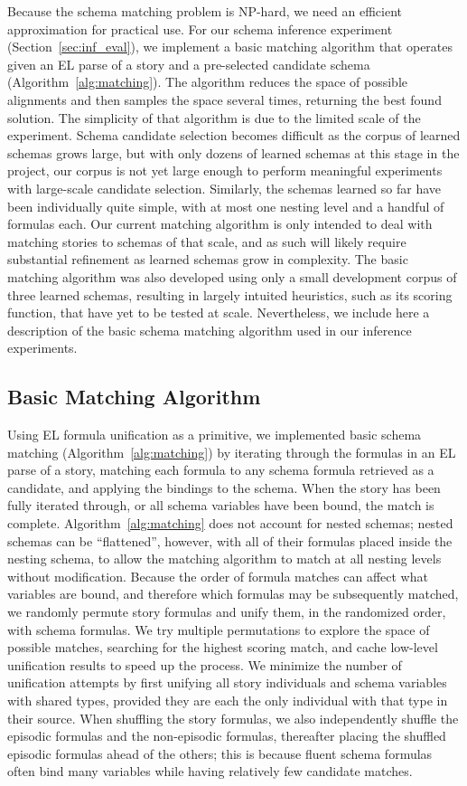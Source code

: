 Because the schema matching problem is $\mathrm{NP}$-hard, we need an efficient approximation for practical use. For our schema inference experiment (Section~\ref{sec:inf_eval}), we implement a basic matching algorithm that operates given an EL parse of a story and a pre-selected candidate schema (Algorithm~\ref{alg:matching}). The algorithm reduces the space of possible alignments and then samples the space several times, returning the best found solution. The simplicity of that algorithm is due to the limited scale of the experiment. Schema candidate selection becomes difficult as the corpus of learned schemas grows large, but with only dozens of learned schemas at this stage in the project, our corpus is not yet large enough to perform meaningful experiments with large-scale candidate selection. Similarly, the schemas learned so far have been individually quite simple, with at most one nesting level and a handful of formulas each. Our current matching algorithm is only intended to deal with matching stories to schemas of that scale, and as such will likely require substantial refinement as learned schemas grow in complexity. The basic matching algorithm was also developed using only a small development corpus of three learned schemas, resulting in largely intuited heuristics, such as its scoring function, that have yet to be tested at scale. Nevertheless, we include here a description of the basic schema matching algorithm used in our inference experiments.

\subsection{Basic Matching Algorithm}
\label{sec:basic_algo}

Using EL formula unification as a primitive, we implemented basic schema matching (Algorithm~\ref{alg:matching}) by iterating through the formulas in an EL parse of a story, matching each formula to any schema formula retrieved as a candidate, and applying the bindings to the schema. When the story has been fully iterated through, or all schema variables have been bound, the match is complete.
Algorithm~\ref{alg:matching} does not account for nested schemas; nested schemas can be ``flattened'', however, with all of their formulas placed inside the nesting schema, to allow the matching algorithm to match at all nesting levels without modification.
Because the order of formula matches can affect what variables are bound, and therefore which formulas may be subsequently matched, we randomly permute story formulas and unify them, in the randomized order, with schema formulas.
We try multiple permutations to explore the space of possible matches, searching for the highest scoring match, and cache low-level unification results to speed up the process.
We minimize the number of unification attempts by first unifying all story individuals and schema variables with shared types, provided they are each the only individual with that type in their source.
When shuffling the story formulas, we also independently shuffle the episodic formulas and the non-episodic formulas, thereafter placing the shuffled episodic formulas ahead of the others; this is because fluent schema formulas often bind many variables while having relatively few candidate matches.

